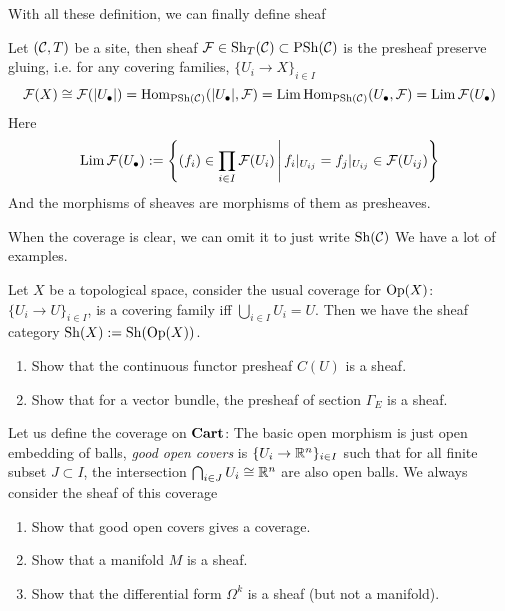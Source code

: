 With all these definition, we can finally define sheaf
\begin{definition}[Sheaf]
 Let $(\mathcal{C},T)$ be a site, then sheaf $\mathcal{F}\in\mathrm{Sh}_T(\mathcal{C})\subset \mathrm{PSh}(\mathcal{C})$ is the presheaf preserve gluing, i.e. for any covering families, $\{ U_i \to X \}_{i \in I}$
   \[
     \mathcal{F}(X)\cong \mathcal{F}(|U_{\bullet}|) =\mathrm{Hom}_{\mathrm{PSh}(\mathcal{C})}(|U_{\bullet}|, \mathcal{F})= \operatorname*{\mathrm{Lim}} \mathrm{Hom}_{\mathrm{PSh}(\mathcal{C})}(U_{\bullet},\mathcal{F})=\operatorname*{\mathrm{Lim}} \mathcal{F}(U_{\bullet})
   \] 
  Here \[
    \operatorname*{\mathrm{Lim}} \mathcal{F}(U_{\bullet}) := \left\{ (f_i)\in \prod_{i\in I}\mathcal{F}(U_{i}) \,\middle\vert\, f_i|_{U_{ij}}=f_j|_{U_{ij}}\in \mathcal{F}(U_{ij})\right\}
  \] 
  And the morphisms of sheaves are morphisms of them as presheaves.
\end{definition}
When the coverage is clear, we can omit it to just write $ \mathrm{Sh}(\mathcal{C})$
We have a lot of examples.
\begin{example}
  Let $X$ be a topological space, consider the usual coverage for $\mathrm{Op}(X)$: $\{ U_i \to U \}_{i \in I}$, is a covering family iff $ \bigcup_{i\in I} U_i =U$. Then we have the sheaf category $\mathrm{Sh}(X):= \mathrm{Sh}(\mathrm{Op}(X))$.
  
  \begin{exercise}
   \begin{enumerate}
    \item Show that the continuous functor presheaf $C(U)$ is a sheaf.
    \item Show that for a vector bundle, the presheaf of section $\Gamma_E$ is a sheaf.
   \end{enumerate} 
  \end{exercise}
\end{example}

\begin{example}
  Let us define the coverage on $\mathbf{Cart}$: The basic open morphism is just open embedding of balls, \emph{good open covers} is $\{ U_i \to \mathbb{R}^n \}_{i \in I}$ such that for all finite subset $J\subset I $, the intersection $\bigcap_{i\in J}U_i \cong \mathbb{R}^n$ are also open balls. We always consider the sheaf of this coverage
  \begin{exercise}
   \begin{enumerate}
    \item Show that good open covers gives a coverage. 
    \item Show that a manifold $M$ is a sheaf.
    \item Show that the differential form $\Omega^k$ is a sheaf (but not a manifold).
   \end{enumerate} 
  \end{exercise}
\end{example}

